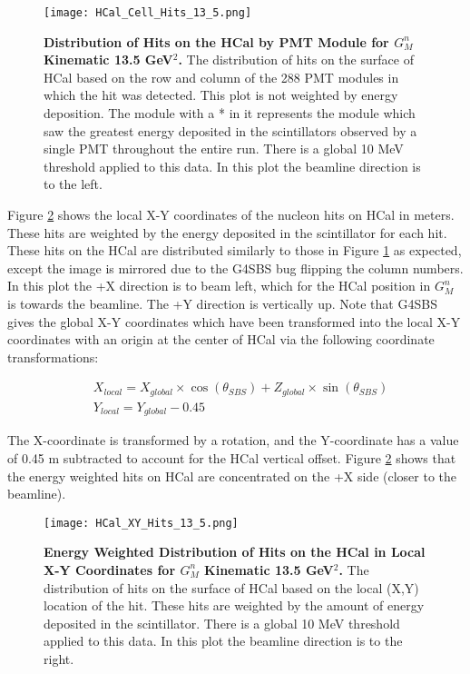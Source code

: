\documentclass[10pt]{article}
\begin{document}
	\begin{figure}[!ht]
	\begin{center}
	\texttt{[image: HCal\_Cell\_Hits\_13\_5.png]}
	\end{center}
	\caption{
	{\bf{Distribution of Hits on the HCal by PMT Module for $G_M^n$ Kinematic 13.5 GeV$^2$.}} The distribution of hits on the surface of HCal based on the row and column of the 288 PMT modules in which the hit was detected. This plot is not weighted by energy deposition. The module with a * in it represents the module which saw the greatest energy deposited in the scintillators observed by a single PMT throughout the entire run. There is a global 10 MeV threshold applied to this data. In this plot the beamline direction is to the left.}
	\label{fig:cell_hits}
	\end{figure}	
	
	Figure \ref{fig:xy_hits} shows the local X-Y coordinates of the nucleon hits on HCal in meters. These hits are weighted by the energy deposited in the scintillator for each hit. These hits on the HCal are distributed similarly to those in Figure \ref{fig:cell_hits} as expected, except the image is mirrored due to the G4SBS bug flipping the column numbers. In this plot the +X direction is to beam left, which for the HCal position in $G_M^n$ is towards the beamline. The +Y direction is vertically up. Note that G4SBS gives the global X-Y coordinates which have been transformed into the local X-Y coordinates with an origin at the center of HCal via the following coordinate transformations:
	
	\begin{align}
		&X_{local} = X_{global}\times\cos\left(\theta_{SBS}\right) + Z_{global}\times\sin\left(\theta_{SBS}\right) \\
		&Y_{local} = Y_{global} - 0.45
	\end{align}
	
	\noindent The X-coordinate is transformed by a rotation, and the Y-coordinate has a value of 0.45 m subtracted to account for the HCal vertical offset. Figure \ref{fig:xy_hits} shows that the energy weighted hits on HCal are concentrated on the +X side (closer to the beamline). \\
	
	\begin{figure}[!ht]
	\begin{center}
	\texttt{[image: HCal\_XY\_Hits\_13\_5.png]}
	\end{center}
	\caption{
	{\bf{Energy Weighted Distribution of Hits on the HCal in Local X-Y Coordinates for $G_M^n$ Kinematic 13.5 GeV$^2$.}} The distribution of hits on the surface of HCal based on the local (X,Y) location of the hit. These hits are weighted by the amount of energy deposited in the scintillator. There is a global 10 MeV threshold applied to this data. In this plot the beamline direction is to the right.}
	\label{fig:xy_hits}
	\end{figure}	
	
\end{document}
